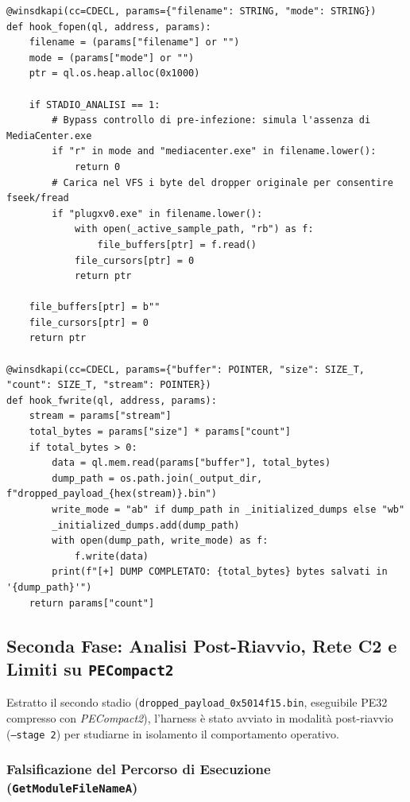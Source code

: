 \documentclass[11pt, a4paper]{article}
\begin{document}
\begin{lstlisting}[style=pythoncode, caption={Estratto del File System Virtuale (VFS) per il bypass di pre-infezione e il dump di MediaCenter.exe.}, label={lst:plugx_vfs}]
@winsdkapi(cc=CDECL, params={"filename": STRING, "mode": STRING})
def hook_fopen(ql, address, params):
    filename = (params["filename"] or "")
    mode = (params["mode"] or "")
    ptr = ql.os.heap.alloc(0x1000)

    if STADIO_ANALISI == 1:
        # Bypass controllo di pre-infezione: simula l'assenza di MediaCenter.exe
        if "r" in mode and "mediacenter.exe" in filename.lower():
            return 0
        # Carica nel VFS i byte del dropper originale per consentire fseek/fread
        if "plugxv0.exe" in filename.lower():
            with open(_active_sample_path, "rb") as f:
                file_buffers[ptr] = f.read()
            file_cursors[ptr] = 0
            return ptr

    file_buffers[ptr] = b""
    file_cursors[ptr] = 0
    return ptr

@winsdkapi(cc=CDECL, params={"buffer": POINTER, "size": SIZE_T, "count": SIZE_T, "stream": POINTER})
def hook_fwrite(ql, address, params):
    stream = params["stream"]
    total_bytes = params["size"] * params["count"]
    if total_bytes > 0:
        data = ql.mem.read(params["buffer"], total_bytes)
        dump_path = os.path.join(_output_dir, f"dropped_payload_{hex(stream)}.bin")
        write_mode = "ab" if dump_path in _initialized_dumps else "wb"
        _initialized_dumps.add(dump_path)
        with open(dump_path, write_mode) as f:
            f.write(data)
        print(f"[+] DUMP COMPLETATO: {total_bytes} bytes salvati in '{dump_path}'")
    return params["count"]
\end{lstlisting}

\subsection{Seconda Fase: Analisi Post-Riavvio, Rete C2 e Limiti su \texttt{PECompact2}}

Estratto il secondo stadio (\texttt{dropped\_\allowbreak{}payload\_\allowbreak{}0x5014f15.\allowbreak{}bin}, eseguibile PE32 compresso con \textit{PECompact2}), l'harness \`e stato avviato in modalit\`a post-riavvio (\texttt{--stage 2}) per studiarne in isolamento il comportamento operativo.

\subsubsection{Falsificazione del Percorso di Esecuzione (\texttt{GetModuleFileNameA})}
\end{document}
